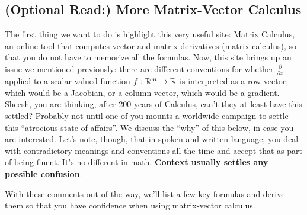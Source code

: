 \subsection{(Optional Read:) More Matrix-Vector Calculus}
\label{sec:MoreMatrixVectorCalculus}

The first thing we want to do is highlight this very useful site: \href{https://www.matrixcalculus.org/}{Matrix Calculus}, an online tool that computes vector and matrix derivatives (matrix calculus), so that you do not have to memorize all the formulas. Now, this site brings up an issue we mentioned previously: there are different conventions for whether $\frac{\partial }{\partial x}$ applied to a scalar-valued function $f:\mathbb R^{m} \to \mathbb R$ is interpreted as a row vector, which would be a Jacobian, or a column vector, which would be a gradient. Sheesh, you are thinking, after 200 years of Calculus, can't they at least have this settled? Probably not until one of you mounts a worldwide campaign to settle this ``atrocious state of affairs''. We discuss the ``why'' of this below, in case you are interested. Let's note, though, that in spoken and written language, you deal with contradictory meanings and conventions all the time and accept that as part of being fluent. It's no different in math. \textbf{Context usually settles any possible confusion}.


With these comments out of the way, we'll list a few key formulas and derive them so that you have confidence when using matrix-vector calculus.


